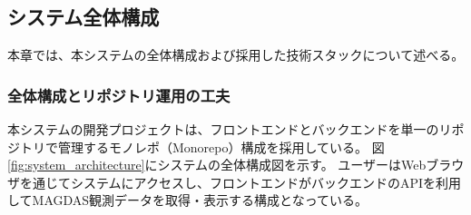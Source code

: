 \subsection{システム全体構成}
本章では、本システムの全体構成および採用した技術スタックについて述べる。

\subsubsection{全体構成とリポジトリ運用の工夫}
本システムの開発プロジェクトは、フロントエンドとバックエンドを単一のリポジトリで管理するモノレポ（Monorepo）構成を採用している。
図\ref{fig:system_architecture}にシステムの全体構成図を示す。
ユーザーはWebブラウザを通じてシステムにアクセスし、フロントエンドがバックエンドのAPIを利用してMAGDAS観測データを取得・表示する構成となっている。

